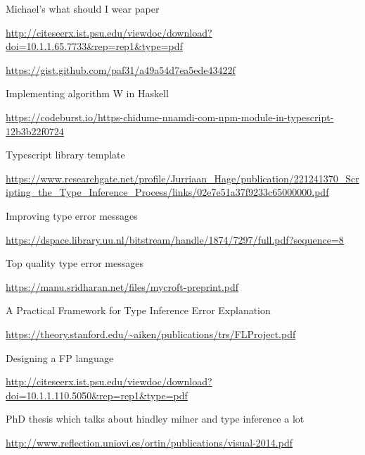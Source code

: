 \documentclass[a4paper,fleqn,12pt]{article}
\begin{document}
Michael’s what should I wear paper

\underline{\href{http://citeseerx.ist.psu.edu/viewdoc/download?doi=10.1.1.65.7733\&rep=rep1\&type=pdf}{http://citeseerx.ist.psu.edu/viewdoc/download?doi=10.1.1.65.7733\&rep=rep1\&type=pdf}}

\underline{\href{https://gist.github.com/paf31/a49a54d7ea5ede43422f}{https://gist.github.com/paf31/a49a54d7ea5ede43422f}}

Implementing algorithm W in Haskell

\underline{\href{https://codeburst.io/https-chidume-nnamdi-com-npm-module-in-typescript-12b3b22f0724}{https://codeburst.io/https-chidume-nnamdi-com-npm-module-in-typescript-12b3b22f0724}}

Typescript library template

\underline{\href{https://www.researchgate.net/profile/Jurriaan\_Hage/publication/221241370\_Scripting\_the\_Type\_Inference\_Process/links/02e7e51a37f9233c65000000.pdf}{https://www.researchgate.net/profile/Jurriaan\_Hage/publication/221241370\_Scripting\_the\_Type\_Inference\_Process/links/02e7e51a37f9233c65000000.pdf}}

Improving type error messages

\underline{\href{https://dspace.library.uu.nl/bitstream/handle/1874/7297/full.pdf?sequence=8}{https://dspace.library.uu.nl/bitstream/handle/1874/7297/full.pdf?sequence=8}}

Top quality type error messages

\underline{\href{https://manu.sridharan.net/files/mycroft-preprint.pdf}{https://manu.sridharan.net/files/mycroft-preprint.pdf}}

A Practical Framework for Type Inference Error Explanation

\underline{\href{https://theory.stanford.edu/\textasciitilde aiken/publications/trs/FLProject.pdf}{https://theory.stanford.edu/\textasciitilde aiken/publications/trs/FLProject.pdf}}

Designing a FP language

\underline{\href{http://citeseerx.ist.psu.edu/viewdoc/download?doi=10.1.1.110.5050\&rep=rep1\&type=pdf}{http://citeseerx.ist.psu.edu/viewdoc/download?doi=10.1.1.110.5050\&rep=rep1\&type=pdf}}

PhD thesis which talks about hindley milner and type inference a lot

\underline{\href{http://www.reflection.uniovi.es/ortin/publications/visual-2014.pdf}{http://www.reflection.uniovi.es/ortin/publications/visual-2014.pdf}}
\end{document}
